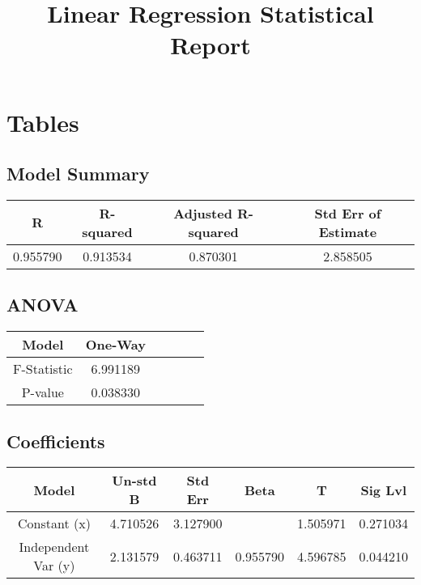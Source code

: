 \documentclass[]{article}
\begin{document}
\title{Linear Regression Statistical Report}
\author{\color{gold}{nGQD}}
\maketitle


\section{Tables}

\subsection{Model Summary}
\begin{table}[h]
\begin{tabular}{cccc}
\toprule
R & R-squared & Adjusted R-squared & Std Err of Estimate \\
\midrule
0.955790 & 0.913534 & 0.870301 & 2.858505 \\
\bottomrule
\end{tabular}
\end{table}

\subsection{ANOVA}
\begin{table}[h]
\begin{tabular}{cccccc}
\toprule
Model & One-Way \\
\midrule
F-Statistic & 6.991189 \\
P-value & 0.038330 \\
\bottomrule
\end{tabular}
\end{table}

\subsection{Coefficients}
\begin{table}[h]
\begin{tabular}{cccccc}
\toprule
Model & Un-std B & Std Err & Beta & T & Sig Lvl \\
\midrule
Constant (x) & 4.710526 & 3.127900 &  & 1.505971 & 0.271034 \\
Independent Var (y) & 2.131579 & 0.463711 & 0.955790 & 4.596785 & 0.044210 \\
\bottomrule
\end{tabular}
\end{table}
\end{document}

